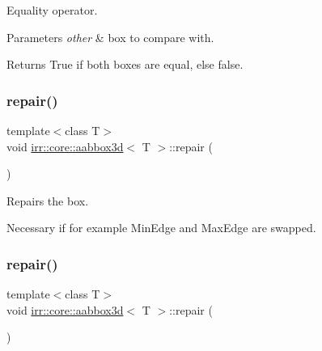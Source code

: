 Equality operator. 


\begin{DoxyParams}{Parameters}
{\em other} & box to compare with. \\
\hline
\end{DoxyParams}
\begin{DoxyReturn}{Returns}
True if both boxes are equal, else false. 
\end{DoxyReturn}
\mbox{\label{classirr_1_1core_1_1aabbox3d_a904b14e6b6a99187820a7407b5d7cf23}} 
\subsubsection{\texorpdfstring{repair()}{repair()}\hspace{0.1cm}{\footnotesize\ttfamily [1/2]}}
{\footnotesize\ttfamily template$<$class T$>$ \\
void \hyperlink{classirr_1_1core_1_1aabbox3d}{irr\+::core\+::aabbox3d}$<$ T $>$\+::repair (\begin{DoxyParamCaption}{ }\end{DoxyParamCaption})\hspace{0.3cm}{\ttfamily [inline]}}



Repairs the box. 

Necessary if for example Min\+Edge and Max\+Edge are swapped. \mbox{\label{classirr_1_1core_1_1aabbox3d_a904b14e6b6a99187820a7407b5d7cf23}} 
\subsubsection{\texorpdfstring{repair()}{repair()}\hspace{0.1cm}{\footnotesize\ttfamily [2/2]}}
{\footnotesize\ttfamily template$<$class T$>$ \\
void \hyperlink{classirr_1_1core_1_1aabbox3d}{irr\+::core\+::aabbox3d}$<$ T $>$\+::repair (\begin{DoxyParamCaption}{ }\end{DoxyParamCaption})\hspace{0.3cm}{\ttfamily [inline]}}




